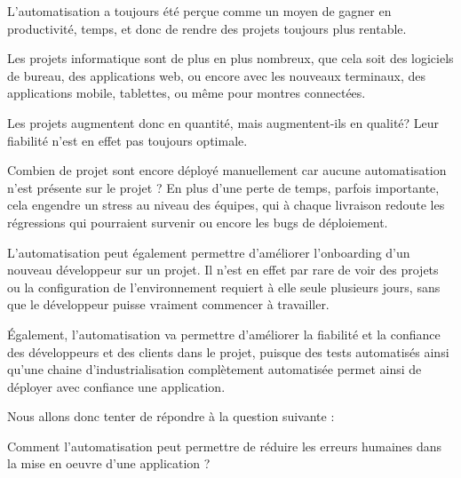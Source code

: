 \vfill

	L'automatisation a toujours été perçue comme un moyen de gagner en productivité, temps, et donc de rendre des projets toujours plus rentable.
	
	Les projets informatique sont de plus en plus nombreux, que cela soit des logiciels de bureau, des applications web, ou encore avec les nouveaux terminaux, des applications mobile, tablettes, ou même pour montres connectées.
	
	Les projets augmentent donc en quantité, mais augmentent-ils en qualité? Leur fiabilité n'est en effet pas toujours optimale. 
	
	Combien de projet sont encore déployé manuellement car aucune automatisation n'est présente sur le projet ? En plus d'une perte de temps, parfois importante, cela engendre un stress au niveau des équipes, qui à chaque livraison redoute les régressions qui pourraient survenir ou encore les bugs de déploiement.
	
	L'automatisation peut également permettre d'améliorer l'onboarding d'un nouveau développeur sur un projet. Il n'est en effet par rare de voir des projets ou la configuration de l'environnement requiert à elle seule plusieurs jours, sans que le développeur puisse vraiment commencer à travailler.
	
	Également, l'automatisation va permettre d'améliorer la fiabilité et la confiance des développeurs et des clients dans le projet, puisque des tests automatisés ainsi qu'une chaine d'industrialisation complètement automatisée permet ainsi de déployer avec confiance une application.
	
	Nous allons donc tenter de répondre à la question suivante : 
	
	Comment l'automatisation peut permettre de réduire les erreurs humaines dans la mise en oeuvre d'une application ?
	
\vfill